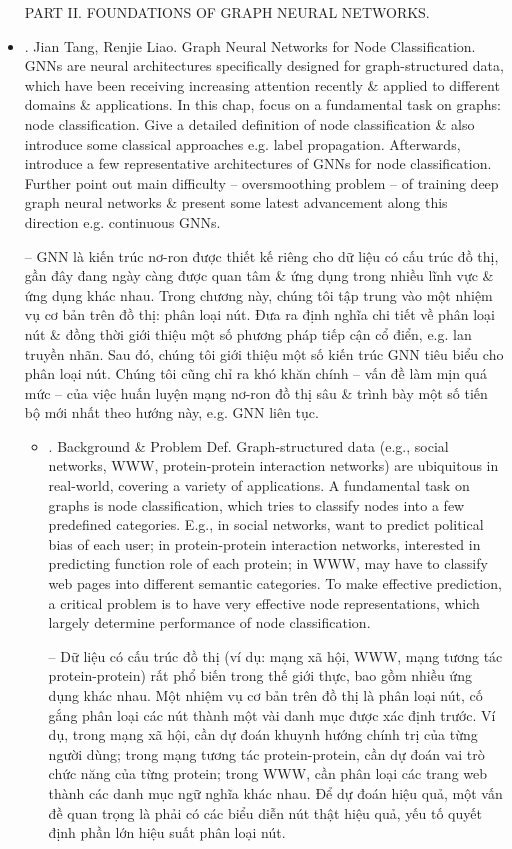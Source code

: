 \documentclass{article}
\begin{document}
\begin{itemize}
    PART II. FOUNDATIONS OF GRAPH NEURAL NETWORKS.
    \item {. {\sc Jian Tang, Renjie Liao}. Graph Neural Networks for Node Classification.} GNNs are neural architectures specifically designed for graph-structured data, which have been receiving increasing attention recently \& applied to different domains \& applications. In this chap, focus on a fundamental task on graphs: node classification. Give a detailed definition of node classification \& also introduce some classical approaches e.g. label propagation. Afterwards, introduce a few representative architectures of GNNs for node classification. Further point out main difficulty -- oversmoothing problem -- of training deep graph neural networks \& present some latest advancement along this direction e.g. continuous GNNs.

    -- GNN là kiến trúc nơ-ron được thiết kế riêng cho dữ liệu có cấu trúc đồ thị, gần đây đang ngày càng được quan tâm \& ứng dụng trong nhiều lĩnh vực \& ứng dụng khác nhau. Trong chương này, chúng tôi tập trung vào một nhiệm vụ cơ bản trên đồ thị: phân loại nút. Đưa ra định nghĩa chi tiết về phân loại nút \& đồng thời giới thiệu một số phương pháp tiếp cận cổ điển, e.g. lan truyền nhãn. Sau đó, chúng tôi giới thiệu một số kiến trúc GNN tiêu biểu cho phân loại nút. Chúng tôi cũng chỉ ra khó khăn chính -- vấn đề làm mịn quá mức -- của việc huấn luyện mạng nơ-ron đồ thị sâu \& trình bày một số tiến bộ mới nhất theo hướng này, e.g. GNN liên tục.
    \begin{itemize}
        \item {. Background \& Problem Def.} Graph-structured data (e.g., social networks, WWW, protein-protein interaction networks) are ubiquitous in real-world, covering a variety of applications. A fundamental task on graphs is node classification, which tries to classify nodes into a few predefined categories. E.g., in social networks, want to predict political bias of each user; in protein-protein interaction networks, interested in predicting function role of each protein; in WWW, may have to classify web pages into different semantic categories. To make effective prediction, a critical problem is to have very effective node representations, which largely determine performance of node classification.

        -- Dữ liệu có cấu trúc đồ thị (ví dụ: mạng xã hội, WWW, mạng tương tác protein-protein) rất phổ biến trong thế giới thực, bao gồm nhiều ứng dụng khác nhau. Một nhiệm vụ cơ bản trên đồ thị là phân loại nút, cố gắng phân loại các nút thành một vài danh mục được xác định trước. Ví dụ, trong mạng xã hội, cần dự đoán khuynh hướng chính trị của từng người dùng; trong mạng tương tác protein-protein, cần dự đoán vai trò chức năng của từng protein; trong WWW, cần phân loại các trang web thành các danh mục ngữ nghĩa khác nhau. Để dự đoán hiệu quả, một vấn đề quan trọng là phải có các biểu diễn nút thật hiệu quả, yếu tố quyết định phần lớn hiệu suất phân loại nút.


\end{itemize}
\end{itemize}
\end{document}
